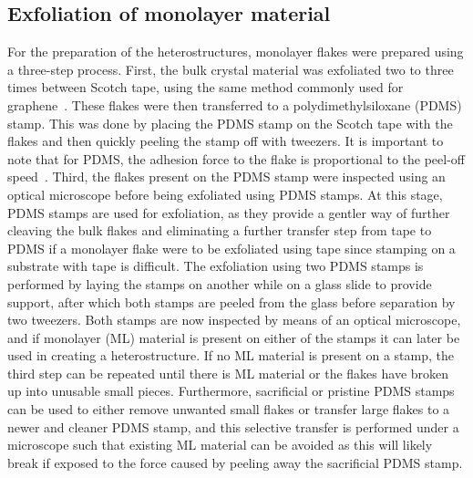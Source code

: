 \subsection{Exfoliation of monolayer material}
%
For the preparation of the heterostructures, monolayer flakes were prepared using a three-step process.
%
First, the bulk crystal material was exfoliated two to three times between Scotch tape, using the same method commonly used for graphene~\cite{novoselovRoomTemperatureQuantumHall2007}. 
%
These flakes were then transferred to a polydimethylsiloxane (PDMS) stamp.
%
This was done by placing the PDMS stamp on the Scotch tape with the flakes and then quickly peeling the stamp off with tweezers. 
%
It is important to note that for PDMS, the adhesion force to the flake is proportional to the peel-off speed~\cite{kusakaMicrocontactPatterningConductive2015}.
%
Third, the flakes present on the PDMS stamp were inspected using an optical microscope before being exfoliated using PDMS stamps. At this stage, PDMS stamps are used for exfoliation, as they provide a gentler way of further cleaving the bulk flakes and eliminating a further transfer step from tape to PDMS if a monolayer flake were to be exfoliated using tape since stamping on a substrate with tape is difficult. The exfoliation using two PDMS stamps is performed by laying the stamps on another while on a glass slide to provide support, after which both stamps are peeled from the glass before separation by two tweezers. Both stamps are now inspected by means of an optical microscope, and if monolayer (ML) material is present on either of the stamps it can later be used in creating a heterostructure.
If no ML material is present on a stamp, the third step can be repeated until there is ML material or the flakes have broken up into unusable small pieces.
Furthermore, sacrificial or pristine PDMS stamps can be used to either remove unwanted small flakes or transfer large flakes to a newer and cleaner PDMS stamp, and this selective transfer is performed under a microscope such that existing ML material can be avoided as this will likely break if exposed to the force caused by peeling away the sacrificial PDMS stamp.

